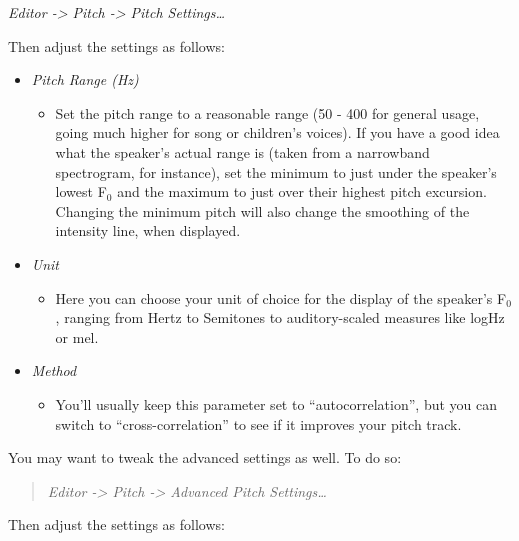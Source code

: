\emph{Editor -\textgreater{} Pitch -\textgreater{} Pitch
Settings\ldots{}}

Then adjust the settings as follows:

\begin{itemize}
\tightlist
\item
  \emph{Pitch Range (Hz)}

  \begin{itemize}
  \tightlist
  \item
    Set the pitch range to a reasonable range (50 - 400 for general
    usage, going much higher for song or children's voices). If you have
    a good idea what the speaker's actual range is (taken from a
    narrowband spectrogram, for instance), set the minimum to just under
    the speaker's lowest F$_{0}$ and the maximum to just over their highest
    pitch excursion. Changing the minimum pitch will also change the
    smoothing of the intensity line, when displayed.
  \end{itemize}
\item
  \emph{Unit}

  \begin{itemize}
  \tightlist
  \item
    Here you can choose your unit of choice for the display of the
    speaker's F$_{0}$, ranging from Hertz to Semitones to auditory-scaled
    measures like logHz or mel.
  \end{itemize}
\item
  \emph{Method}

  \begin{itemize}
  \tightlist
  \item
    You'll usually keep this parameter set to ``autocorrelation'', but
    you can switch to ``cross-correlation'' to see if it improves your
    pitch track.
  \end{itemize}
\end{itemize}

You may want to tweak the advanced settings as well. To do so:

\begin{quote}
\emph{Editor -\textgreater{} Pitch -\textgreater{} Advanced Pitch
Settings\ldots{}}
\end{quote}

Then adjust the settings as follows:

